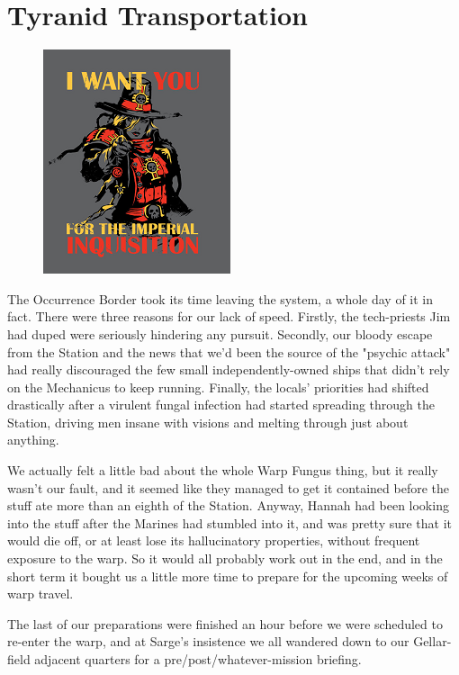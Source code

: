\chapter{Tyranid Transportation}

\begin{figure}
	\begin{center}
		\includegraphics[width=\figwidth]{pics/15/1.png}
	\end{center}
\end{figure}
The Occurrence Border took its time leaving the system, a whole day of it in fact. 
There were three reasons for our lack of speed. 
Firstly, the tech-priests Jim had duped were seriously hindering any pursuit. 
Secondly, our bloody escape from the Station and the news that we'd been the source of the "psychic attack" had really discouraged the few small independently-owned ships that didn't rely on the Mechanicus to keep running. 
Finally, the locals' priorities had shifted drastically after a virulent fungal infection had started spreading through the Station, driving men insane with visions and melting through just about anything.

We actually felt a little bad about the whole Warp Fungus thing, but it really wasn't our fault, and it seemed like they managed to get it contained before the stuff ate more than an eighth of the Station. 
Anyway, Hannah had been looking into the stuff after the Marines had stumbled into it, and was pretty sure that it would die off, or at least lose its hallucinatory properties, without frequent exposure to the warp. 
So it would all probably work out in the end, and in the short term it bought us a little more time to prepare for the upcoming weeks of warp travel.

The last of our preparations were finished an hour before we were scheduled to re-enter the warp, and at Sarge's insistence we all wandered down to our Gellar-field adjacent quarters for a pre/post/whatever-mission briefing.

